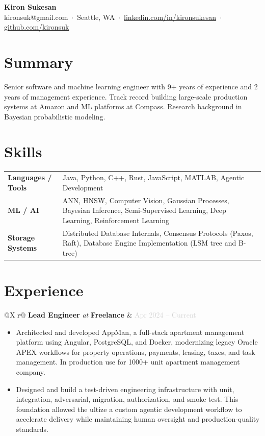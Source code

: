 \documentclass[10pt, letterpaper]{article}
\makeatletter
\newcommand{\resumeheader}[5]{%
  \begin{center}
    {\LARGE\bfseries #1}\\[4pt]
    {\color{lightgray}\small
      #2 \,$\cdot$\, #3 \,$\cdot$\, \href{#4}{linkedin.com/in/kironsukesan} \,$\cdot$\, \href{#5}{github.com/kironsuk}
    }
  \end{center}
}
\newcommand{\experienceentry}[4]{%
  \vspace{4pt}
  \noindent
  \begin{tabularx}{\linewidth}{@{}X r@{}}
    \textbf{#1} \textit{\color{lightgray}at} \textbf{#2} & \textcolor{lightgray}{\small #3} \\
    \multicolumn{2}{@{}l@{}}{\textit{\color{lightgray}\small #4}}
  \end{tabularx}
  \vspace{1pt}
}
\makeatother
\begin{document}
\pagestyle{empty}

\resumeheader
  {Kiron Sukesan}
  {kironsuk@gmail.com}
  {Seattle, WA}
  {https://linkedin.com/in/kironsukesan}
  {https://github.com/kironsuk}

\vspace{5pt}

\section{Summary}
Senior software and machine learning engineer with 9+ years of experience and 2 years of management experience. Track record building large-scale production systems at Amazon and ML platforms at Compass. Research background in Bayesian probabilistic modeling.

\section{Skills}
\begin{tabularx}{\linewidth}{@{} l X @{}}
  \textbf{Languages / Tools}      & Java, Python, C++, Rust, JavaScript, MATLAB, Agentic Development \\[2pt]
  \textbf{ML / AI}        & ANN, HNSW, Computer Vision, Gaussian Processes, Bayesian Inference, Semi-Supervised Learning, Deep Learning, Reinforcement Learning \\[2pt]
  \textbf{Storage Systems}        & Distributed Database Internals, Consensus Protocols (Paxos, Raft), Database Engine Implementation (LSM tree and B-tree)  \\[2pt]
\end{tabularx}

\section{Experience}

\experienceentry{Lead Engineer}{Freelance}{Apr 2024 -- Current}{Remote}
\begin{itemize}
  \item Architected and developed AppMan, a full-stack apartment management platform using Angular, PostgreSQL, and Docker, modernizing legacy Oracle APEX workflows for property operations, payments, leasing, taxes, and task management. In production use for 1000+ unit apartment management company.  
  \item Designed and build a test-driven engineering infrastructure with unit, integration, adversarial, migration, authorization, and smoke test. This foundation allowed the ultize a custom agentic development workflow to accelerate delivery while maintaining human oversight and production-quality standards.
\end{itemize}
\end{document}

